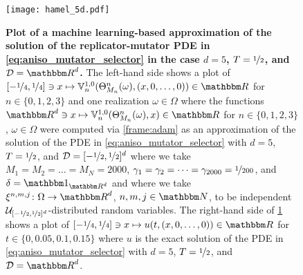 \begin{table}
\begin{center}
{\begin{approxtabular}
			\hline
		\end{approxtabular}}
	\end{center}
	\caption{\textbf{Numerical simulations for the approximation method in \cref{def:general_algorithm} in the case of the replicator-mutator PDEs in \eqref{eq:aniso_mutator_selector} in \cref{subsec:aniso_mutator_selector}
	where we assume for every
		$n,m,j\in\N$
	that
		$\mathcal D=\R^d$,
		$\xi^{n,m,j}=0$,
		$\gamma_m = \nicefrac{1}{100}$,
		and
		$M_n=1000$
	and where we assume for every
	  $\mathbf x\in\R^d$
	that
	  $\delta(\mathbf x)=(2\pi)^{-\nicefrac d2}\mathfrak t^{-d}\exp\bpr{-\tfrac{\norm{\mathbf x}^2}{2\mathfrak t^2}}$.
		}
	}
	\label{table:aniso_mutator_selector}
\end{table}

\begin{figure}
	\centering
	\texttt{[image: hamel\_5d.pdf]}
	\caption{\textbf{Plot of a machine learning-based approximation of the solution of the replicator-mutator PDE in \cref{eq:aniso_mutator_selector} in the case $d=5$, $T=\nicefrac12$, and $\mathcal D=\R^d$.}
	The left-hand side shows a plot of $[-\nicefrac{1}{4}, \nicefrac{1}{4}] \ni x \mapsto \bV_n^{1,0}(\Theta^n_{M_n}(\omega),(x, 0, \dots,0)) \in \R$ for $n\in\{0,1,2,3\}$ and one realization $\omega\in\Omega$ where the functions $\R^d\ni x\mapsto \bV_n^{1,0}(\Theta^n_{M_n}(\omega),x)\in\R$ for $n\in\{0,1,2,3\}$, $\omega\in\Omega$ were computed via \cref{frame:adam} as an approximation of the solution of the PDE in \cref{eq:aniso_mutator_selector} with $d=5$, $T=\nicefrac12$, and $\mathcal D=[-\nicefrac 12,\nicefrac 12]^d$ where we take
		$M_1=M_2=\ldots=M_N=2000$,
		$\gamma_1=\gamma_2=\dots=\gamma_{2000}=\nicefrac{1}{200}$,
		and
		$\delta=\one_{\R^d}$
		and where we take
		$\xi^{n,m,j}\colon\Omega\to\R^d$, $n, m, j \in \N$,
		to be independent $\mathcal{U}_{[-\nicefrac{1}{2},\nicefrac{1}{2}]^d}$-distributed random variables.
	The right-hand side of \cref{fig:rep_mut} shows a plot of $[-\nicefrac{1}{4}, \nicefrac{1}{4}] \ni x \mapsto u(t, (x, 0,  \dots,0)) \in \R$ for $t\in\{0,0.05,0.1,0.15\}$ where $u$ is the exact solution of the PDE in \cref{eq:aniso_mutator_selector} with $d=5$, $T=\nicefrac12$, and $\mathcal D=\R^d$.
	\label{fig:rep_mut}}
\end{figure}


